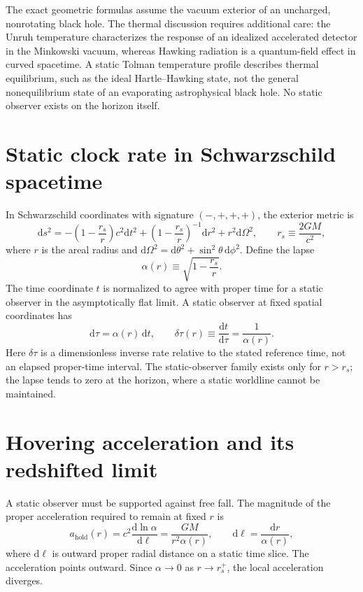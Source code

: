\documentclass[12pt]{article}
\begin{document}
The exact geometric formulas assume the vacuum exterior of an uncharged, nonrotating black hole. The thermal discussion requires additional care: the Unruh temperature characterizes the response of an idealized accelerated detector in the Minkowski vacuum, whereas Hawking radiation is a quantum-field effect in curved spacetime. A static Tolman temperature profile describes thermal equilibrium, such as the ideal Hartle--Hawking state, not the general nonequilibrium state of an evaporating astrophysical black hole. No static observer exists on the horizon itself.

\section{Static clock rate in Schwarzschild spacetime}

In Schwarzschild coordinates with signature $(-,+,+,+)$, the exterior metric is \cite{Schwarzschild}
\begin{equation}
  \mathrm{d}s^2
  =-\left(1-\frac{r_s}{r}\right)c^2\mathrm{d}t^2
   +\left(1-\frac{r_s}{r}\right)^{-1}\mathrm{d}r^2
   +r^2\mathrm{d}\Omega^2,
  \qquad
  r_s\equiv\frac{2GM}{c^2},
  \label{eq:schwarzschild-metric}
\end{equation}
where $r$ is the areal radius and $\mathrm{d}\Omega^2=\mathrm{d}\theta^2+\sin^2\theta\,\mathrm{d}\phi^2$. Define the lapse
\begin{equation}
  \alpha(r)\equiv\sqrt{1-\frac{r_s}{r}}.
  \label{eq:lapse}
\end{equation}
The time coordinate $t$ is normalized to agree with proper time for a static observer in the asymptotically flat limit. A static observer at fixed spatial coordinates has
\begin{equation}
  \mathrm{d}\tau=\alpha(r)\,\mathrm{d}t,
  \qquad
  \delta\tau(r)\equiv\frac{\mathrm{d}t}{\mathrm{d}\tau}
  =\frac{1}{\alpha(r)}.
  \label{eq:static-clock-rate}
\end{equation}
Here $\delta\tau$ is a dimensionless inverse rate relative to the stated reference time, not an elapsed proper-time interval. The static-observer family exists only for $r>r_s$; the lapse tends to zero at the horizon, where a static worldline cannot be maintained.

\section{Hovering acceleration and its redshifted limit}

A static observer must be supported against free fall. The magnitude of the proper acceleration required to remain at fixed $r$ is
\begin{equation}
  a_{\mathrm{hold}}(r)
  =c^2\frac{\mathrm{d}\ln\alpha}{\mathrm{d}\ell}
  =\frac{GM}{r^2\alpha(r)},
  \qquad
  \mathrm{d}\ell=\frac{\mathrm{d}r}{\alpha(r)},
  \label{eq:hover-acceleration}
\end{equation}
where $\mathrm{d}\ell$ is outward proper radial distance on a static time slice. The acceleration points outward. Since $\alpha\to0$ as $r\to r_s^+$, the local acceleration diverges.
\end{document}

